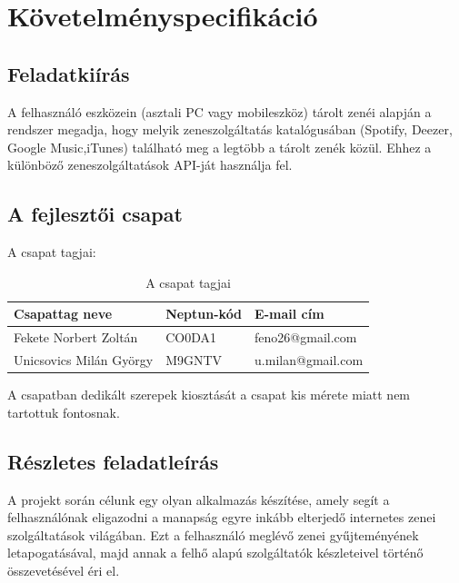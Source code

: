 \section{Követelményspecifikáció}
\label{sec:specification}

\subsection{Feladatkiírás}
\label{sub:feladatkiiras}

A felhasználó eszközein (asztali PC vagy mobileszköz) tárolt zenéi alapján a rendszer megadja, hogy melyik zeneszolgáltatás katalógusában (Spotify, Deezer, Google Music,iTunes) található meg a legtöbb a tárolt zenék közül. Ehhez a különböző zeneszolgáltatások API-ját használja fel.


\subsection{A fejlesztői csapat}
\label{sub:afejlesztoicsapat}

A csapat tagjai:

\begin{table}[htb]
\begin{center}
\begin{tabular}{|l|l|l|}
\hline
\textbf{Csapattag neve} & \textbf{Neptun-kód} & \textbf{E-mail cím} \\ \hline
Fekete Norbert Zoltán & CO0DA1 & feno26@gmail.com \\ \hline
Unicsovics Milán György & M9GNTV & u.milan@gmail.com \\ \hline
\end{tabular}
\end{center}
\label{tab:acsapattagjai}
\caption{A csapat tagjai}
\end{table}

A csapatban dedikált szerepek kiosztását a csapat kis mérete miatt nem tartottuk fontosnak.


\subsection{Részletes feladatleírás}
\label{sub:reszletesfeladatkiiras}

A projekt során célunk egy olyan alkalmazás készítése, amely segít a felhasználónak eligazodni a manapság egyre inkább elterjedő internetes zenei szolgáltatások világában. Ezt a felhasználó meglévő zenei gyűjteményének letapogatásával, majd annak a felhő alapú szolgáltatók készleteivel történő összevetésével éri el.

